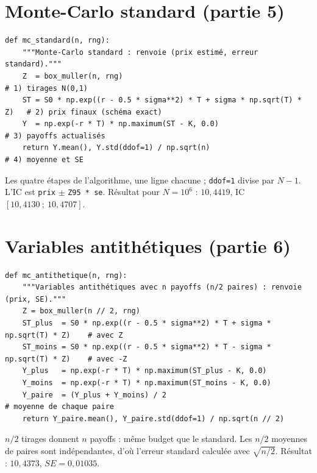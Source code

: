 \section*{Monte-Carlo standard (partie 5)}
\begin{lstlisting}
def mc_standard(n, rng):
    """Monte-Carlo standard : renvoie (prix estimé, erreur standard)."""
    Z  = box_muller(n, rng)                                               # 1) tirages N(0,1)
    ST = S0 * np.exp((r - 0.5 * sigma**2) * T + sigma * np.sqrt(T) * Z)   # 2) prix finaux (schéma exact)
    Y  = np.exp(-r * T) * np.maximum(ST - K, 0.0)                         # 3) payoffs actualisés
    return Y.mean(), Y.std(ddof=1) / np.sqrt(n)                           # 4) moyenne et SE
\end{lstlisting}
Les quatre étapes de l'algorithme, une ligne chacune ; \texttt{ddof=1} divise par $N-1$. L'IC est \texttt{prix} $\pm$ \texttt{Z95 * se}. Résultat pour $N = 10^6$ : $10{,}4419$, IC $[10{,}4130\ ;\ 10{,}4707]$.

\section*{Variables antithétiques (partie 6)}
\begin{lstlisting}
def mc_antithetique(n, rng):
    """Variables antithétiques avec n payoffs (n/2 paires) : renvoie (prix, SE)."""
    Z = box_muller(n // 2, rng)
    ST_plus  = S0 * np.exp((r - 0.5 * sigma**2) * T + sigma * np.sqrt(T) * Z)    # avec Z
    ST_moins = S0 * np.exp((r - 0.5 * sigma**2) * T - sigma * np.sqrt(T) * Z)    # avec -Z
    Y_plus   = np.exp(-r * T) * np.maximum(ST_plus - K, 0.0)
    Y_moins  = np.exp(-r * T) * np.maximum(ST_moins - K, 0.0)
    Y_paire  = (Y_plus + Y_moins) / 2                                            # moyenne de chaque paire
    return Y_paire.mean(), Y_paire.std(ddof=1) / np.sqrt(n // 2)
\end{lstlisting}
$n/2$ tirages donnent $n$ payoffs : même budget que le standard. Les $n/2$ moyennes de paires sont indépendantes, d'où l'erreur standard calculée avec $\sqrt{n/2}$. Résultat : $10{,}4373$, $SE = 0{,}01035$.

